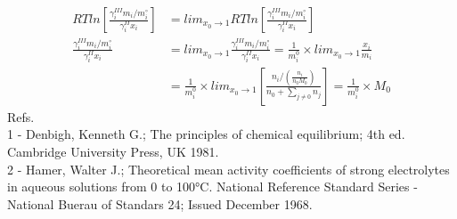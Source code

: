 \documentclass[12pt,a4paper,preview]{standalone}
\begin{document}
\[
\begin{aligned}
RTln\left[ \frac{\gamma_i^{III} m_i/m_i^{\circ}}{\gamma_i^{II} x_i}\right] & = lim_{x_0 \rightarrow 1} RTln\left[ \frac{\gamma_i^{III} m_i/m_i^{\circ}}{\gamma_i^{II} x_i}\right] \\
\frac{\gamma_i^{III} m_i/m_i^{\circ}}{\gamma_i^{II} x_i} & = lim_{x_0 \rightarrow 1} \frac{\gamma_i^{III} m_i/m_i^{\circ}}{\gamma_i^{II} x_i} = \frac{1}{m_i^0} \times lim_{x_0 \rightarrow 1} \frac{x_i}{m_i} \\
& = \frac{1}{m_i^0} \times lim_{x_0 \rightarrow 1} \left[ \frac{n_i/ \left(\frac{n_i}{n_0 M_0}\right)}{n_0+\sum_{j \neq 0}n_j} \right] = \frac{1}{m_i^0} \times M_0
\end{aligned}
\]
Refs. \\ 
 1 - Denbigh, Kenneth G.; The principles of chemical equilibrium; 4th ed. Cambridge University Press, UK 1981. \\ 
 2 - Hamer, Walter J.; Theoretical mean activity coefficients of strong electrolytes in aqueous solutions from 0 to 100°C. National Reference Standard Series - National Buerau of Standars 24; Issued December 1968.
\end{document}
